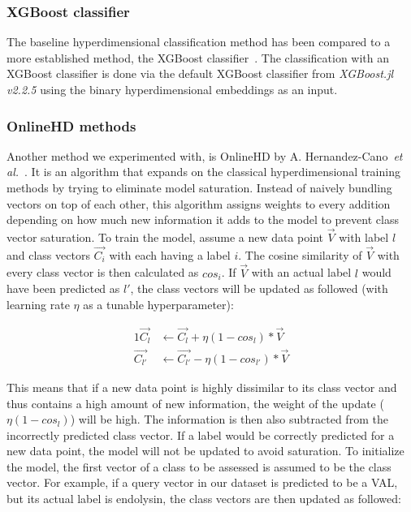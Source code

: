\subsubsection*{XGBoost classifier}
The baseline hyperdimensional classification method has been compared to a more established method, the XGBoost classifier~\cite{xgboost}. The classification with an XGBoost classifier is done via the default XGBoost classifier from \textit{XGBoost.jl v2.2.5} using the binary hyperdimensional embeddings as an input.
\subsubsection*{OnlineHD methods}
Another method we experimented with, is OnlineHD by A. Hernandez-Cano~\textit{et al.}~\cite{onlinehd}. It is an algorithm that expands on the classical hyperdimensional training methods by trying to eliminate model saturation. Instead of naively bundling vectors on top of each other, this algorithm assigns weights to every addition depending on how much new information it adds to the model to prevent class vector saturation. To train the model, assume a new data point $\vec{V}$ with label $l$ and class vectors $\vec{C_{i}}$ with each having a label $i$. The cosine similarity of $\vec{V}$ with every class vector is then calculated as $cos_{i}$. If $\vec{V}$ with an actual label $l$ would have been predicted as $l'$, the class vectors will be updated as followed (with learning rate $\eta$ as a tunable hyperparameter):

\begin{alignat}{1}
    \label{eqn:onlinehd}
    \vec{C_{l}} &\leftarrow \vec{C_{l}} + \eta (1 - cos_{l}) * \vec{V} \\
    \vec{C_{l'}} &\leftarrow \vec{C_{l'}} - \eta (1 - cos_{l'}) * \vec{V}
\end{alignat}

This means that if a new data point is highly dissimilar to its class vector and thus contains a high amount of new information, the weight of the update ($\eta (1 - cos_{l})$) will be high. The information is then also subtracted from the incorrectly predicted class vector. If a label would be correctly predicted for a new data point, the model will not be updated to avoid saturation. To initialize the model, the first vector of a class to be assessed is assumed to be the class vector. For example, if a query vector in our dataset is predicted to be a VAL, but its actual label is endolysin, the class vectors are then updated as followed:

